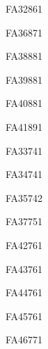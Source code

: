 \documentclass[a4paper,11pt]{report}
\begin{document}
\begin{exof}{FA32}{86}{1} %
\end{exof}

\begin{exof}{FA36}{87}{1} %
\end{exof}

\begin{exof}{FA38}{88}{1} %
\end{exof}

\begin{exof}{FA39}{88}{1} %
\end{exof}

\begin{exof}{FA40}{88}{1} %
\end{exof}

\begin{exof}{FA41}{89}{1} %
\end{exof}



\begin{exol}{FA33}{74}{1} %
\end{exol}


\begin{exol}{FA34}{74}{1} %
\end{exol}

\begin{exol}{FA35}{74}{2} %
\end{exol}

\begin{exol}{FA37}{75}{1} %
\end{exol}



\begin{exol}{FA42}{76}{1} %
\end{exol}

\begin{exol}{FA43}{76}{1} %
\end{exol}

\begin{exol}{FA44}{76}{1} %
\end{exol}

\begin{exol}{FA45}{76}{1} %
\end{exol}

\begin{exol}{FA46}{77}{1} %
\end{exol}
\end{document}
